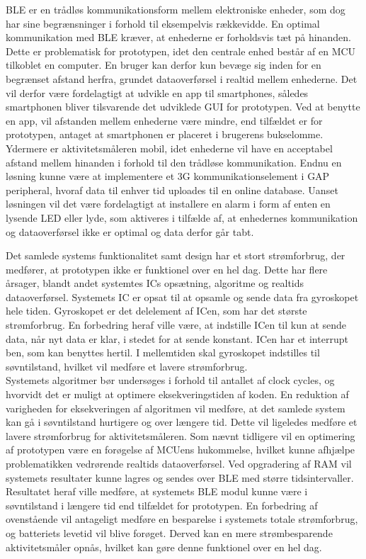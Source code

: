 BLE er en trådløs kommunikationsform mellem elektroniske enheder, som dog har sine begrænsninger i forhold til eksempelvis rækkevidde. En optimal kommunikation med BLE kræver, at enhederne er forholdsvis tæt på hinanden. Dette er problematisk for prototypen, idet den centrale enhed består af en MCU tilkoblet en computer. En bruger kan derfor kun bevæge sig inden for en begrænset afstand herfra, grundet dataoverførsel i realtid mellem enhederne. Det vil derfor være fordelagtigt at udvikle en app til smartphones, således smartphonen bliver tilsvarende det udviklede GUI for prototypen. Ved at benytte en app, vil afstanden mellem enhederne være mindre, end tilfældet er for prototypen, antaget at smartphonen er placeret i brugerens bukselomme. Ydermere er aktivitetsmåleren mobil, idet enhederne vil have en acceptabel afstand mellem hinanden i forhold til den trådløse kommunikation. Endnu en løsning kunne være at implementere et 3G kommunikationselement i GAP peripheral, hvoraf data til enhver tid uploades til en online database. Uanset løsningen vil det være fordelagtigt at installere en alarm i form af enten en lysende LED eller lyde, som aktiveres i tilfælde af, at enhedernes kommunikation og dataoverførsel ikke er optimal og data derfor går tabt. 

Det samlede systems funktionalitet samt design har et stort strømforbrug, der medfører, at prototypen ikke er funktionel over en hel dag. Dette har flere årsager, blandt andet systemtes ICs opsætning, algoritme og realtids dataoverførsel. Systemets IC er opsat til at opsamle og sende data fra gyroskopet hele tiden. Gyroskopet er det delelement af ICen, som har det største strømforbrug. En forbedring heraf ville være, at indstille ICen til kun at sende data, når nyt data er klar, i stedet for at sende konstant. ICen har et interrupt ben, som kan benyttes hertil. I mellemtiden skal gyroskopet indstilles til søvntilstand, hvilket vil medføre et lavere strømforbrug. \\
Systemets algoritmer bør undersøges i forhold til antallet af clock cycles, og hvorvidt det er muligt at optimere eksekveringstiden af koden. En reduktion af varigheden for eksekveringen af algoritmen vil medføre, at det samlede system kan gå i søvntilstand hurtigere og over længere tid. Dette vil ligeledes medføre et lavere strømforbrug for aktivitetsmåleren. Som nævnt tidligere vil en optimering af prototypen være en forøgelse af MCUens hukommelse, hvilket kunne afhjælpe problematikken vedrørende realtids dataoverførsel. Ved opgradering af RAM vil systemets resultater kunne lagres og sendes over BLE med større tidsintervaller. Resultatet heraf ville medføre, at systemets BLE modul kunne være i søvntilstand i længere tid end tilfældet for prototypen. En forbedring af ovenstående vil antageligt medføre en besparelse i systemets totale strømforbrug, og batteriets levetid vil blive forøget. Derved kan en mere strømbesparende aktivitetsmåler opnås, hvilket kan gøre denne funktionel over en hel dag.

